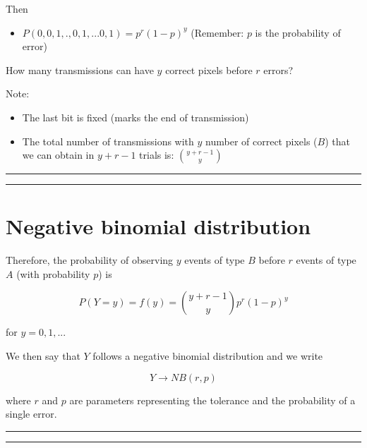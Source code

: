 \documentclass[
]{book}
\providecommand{\tightlist}{%
  \setlength{\itemsep}{0pt}\setlength{\parskip}{0pt}}
\begin{document}
Then

\begin{itemize}
\tightlist
\item
  \(P(0,0,1,., 0,1,...0,1)=p^r(1-p)^y\) (Remember: \(p\) is the probability of error)
\end{itemize}

How many transmissions can have \(y\) correct pixels before \(r\) errors?

Note:

\begin{itemize}
\item
  The last bit is fixed (marks the end of transmission)
\item
  The total number of transmissions with \(y\) number of correct pixels (\(B\)) that we can obtain in \(y + r-1\) trials is: \(\binom {y + r-1} y\)
\end{itemize}

\begin{center}\rule{0.5\linewidth}{0.5pt}\end{center}

\begin{center}\rule{0.5\linewidth}{0.5pt}\end{center}

\hypertarget{negative-binomial-distribution-2}{%
\section{Negative binomial distribution}\label{negative-binomial-distribution-2}}

Therefore, the probability of observing \(y\) events of type \(B\) before \(r\) events of type \(A\) (with probability \(p\)) is

\[P(Y=y)=f(y)=\binom {y+r-1} y p^r(1-p)^y\]

for \(y=0,1,...\)

We then say that \(Y\) follows a negative binomial distribution and we write

\[Y\rightarrow NB(r,p)\]

where \(r\) and \(p\) are parameters representing the tolerance and the probability of a single error.

\begin{center}\rule{0.5\linewidth}{0.5pt}\end{center}

\begin{center}\rule{0.5\linewidth}{0.5pt}\end{center}
\end{document}
